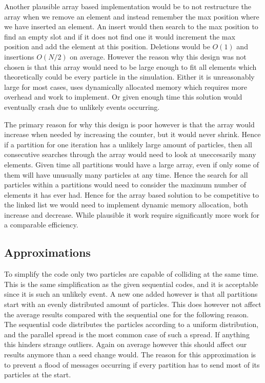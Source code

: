 \documentclass{article}
\begin{document}
 Another plausible array based implementation would be to not restructure the array when we remove an element and instead remember the max position where we have inserted an element. An insert would then search to the max position to find an empty slot and if it does not find one it would increment the max position and add the element at this position. Deletions would be $O(1)$ and insertions $O(N/2)$ on average. However the reason why this design was not chosen is that this array would need to be large enough to fit all elements which theoretically could be every particle in the simulation. Either it is unreasonably large for most cases, uses dynamically allocated memory which requires more overhead and work to implement. Or given enough time this solution would eventually crash due to unlikely events occurring.
 
  The primary reason for why this design is poor however is that the array would increase when needed by increasing the counter, but it would never shrink. Hence if a partition for one iteration has a unlikely large amount of particles, then all consecutive searches through the array would need to look at uneccesarily many elements. Given time all partitions would have a large array, even if only some of them will have unusually many particles at any time. Hence the search for all particles within a partitions would need to consider the maximum number of elements it has ever had. Hence for the array based solution to be competitive to the linked list we would need to implement dynamic memory allocation, both increase and decrease. While plausible it work require significantly more work for a comparable efficiency. 
  
  
  \subsection{Approximations}
To simplify the code only two particles are capable of colliding at the same time. This is the same simplification as the given sequential codes, and it is acceptable since it is such an unlikely event. A new one added however is that all partitions start with an evenly distributed amount of particles. This does however not affect the average results compared with the sequential one for the following reason. The sequential code distributes the particles according to a uniform distribution, and the parallel spread is the most common case of such a spread. If anything this hinders strange outliers. Again on average however this should affect our results anymore than a seed change would. The reason for this approximation is to prevent a flood of messages occurring if every partition has to send most of its particles at the start.
\end{document}
